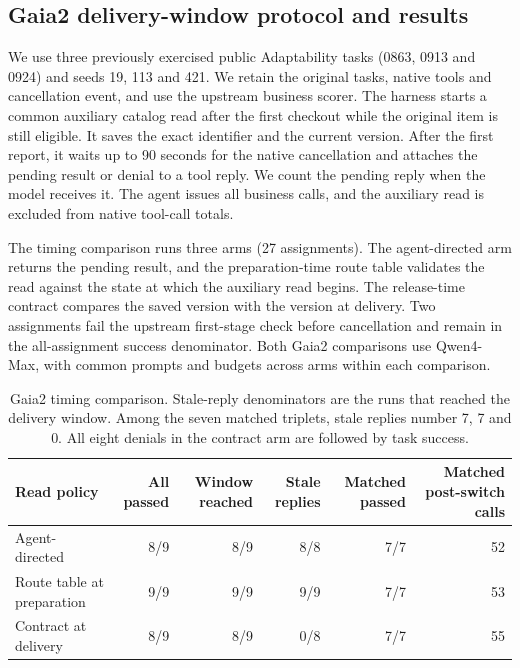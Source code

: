 \subsection{Gaia2 delivery-window protocol and results}
\label{sec:gaia-delivery-details}

We use three previously exercised public Adaptability tasks (0863, 0913 and 0924) and seeds 19, 113 and 421. We retain the original tasks, native tools and cancellation event, and use the upstream business scorer. The harness starts a common auxiliary catalog read after the first checkout while the original item is still eligible. It saves the exact identifier and the current version. After the first report, it waits up to 90 seconds for the native cancellation and attaches the pending result or denial to a tool reply. We count the pending reply when the model receives it. The agent issues all business calls, and the auxiliary read is excluded from native tool-call totals.

The timing comparison runs three arms (27 assignments). The agent-directed arm returns the pending result, and the preparation-time route table validates the read against the state at which the auxiliary read begins. The release-time contract compares the saved version with the version at delivery. Two assignments fail the upstream first-stage check before cancellation and remain in the all-assignment success denominator. Both Gaia2 comparisons use Qwen4-Max, with common prompts and budgets across arms within each comparison.

\begin{table}[t]
\centering
\small
\begin{tabular}{@{}lrrrrr@{}}
\toprule
Read policy & All passed & Window reached & Stale replies & Matched passed & Matched post-switch calls\\
\midrule
Agent-directed & 8/9 & 8/9 & 8/8 & 7/7 & 52\\
Route table at preparation & 9/9 & 9/9 & 9/9 & 7/7 & 53\\
Contract at delivery & 8/9 & 8/9 & 0/8 & 7/7 & 55\\
\bottomrule
\end{tabular}
\caption{Gaia2 timing comparison. Stale-reply denominators are the runs that reached the delivery window. Among the seven matched triplets, stale replies number 7, 7 and 0. All eight denials in the contract arm are followed by task success.}
\label{tab:gaia-window-details}
\end{table}

